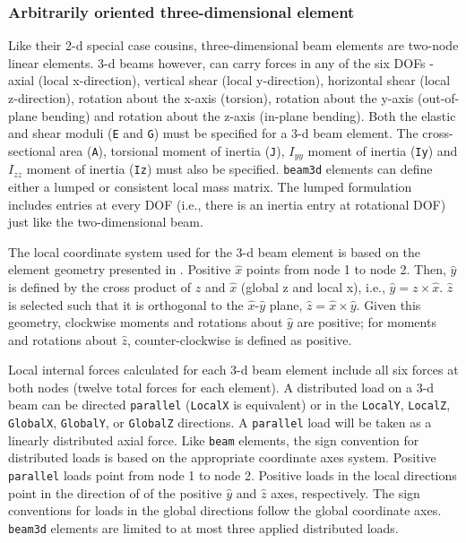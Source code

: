 \subsubsection{Arbitrarily oriented three-dimensional element}

Like their \mbox{2-d} special case cousins, three-dimensional beam elements are 
two-node linear elements.  \mbox{3-d} beams however, can carry forces in any of the 
six DOFs - axial (local x-direction), vertical shear (local y-direction), 
horizontal shear (local z-direction), rotation about the x-axis (torsion), 
rotation about the y-axis (out-of-plane bending) and rotation about the z-axis 
(in-plane bending).  Both the elastic and shear moduli ({\tt E} and {\tt G}) 
must be specified for a \mbox{3-d} beam element.  The cross-sectional area 
({\tt A}), torsional moment of inertia ({\tt J}), $I_{yy}$ moment of 
inertia ({\tt Iy}) and $I_{zz}$ moment of inertia ({\tt Iz}) must also be 
specified.  {\tt beam3d} elements can define either a lumped or consistent
local mass matrix.  The lumped formulation includes entries at every DOF
(i.e., there is an inertia entry at rotational DOF) just like the 
two-dimensional beam.

The local coordinate system used for the \felt{} \mbox{3-d} beam element is based
on the element geometry presented in \cite{logan:fem}.  Positive
$\hat x$ points from node 1 to node 2.  Then, $\hat y$ is defined by
the cross product of $z$ and $\hat x$ (global z and local x), 
i.e., $\hat y = z \times \hat x$.  $\hat z$ is selected such that it is
orthogonal to the $\hat x$-$\hat y$ plane,  
$\hat z = \hat x \times \hat y$.  Given this geometry, clockwise moments
and rotations about $\hat y$ are positive; for moments and rotations about
$\hat z$, counter-clockwise is defined as positive.

Local internal forces calculated for each \mbox{3-d} beam element include all six
forces at both nodes (twelve total forces for each element).  A distributed 
load on a \mbox{3-d} beam can be directed {\tt parallel} ({\tt LocalX} is 
equivalent) or in the {\tt LocalY},
{\tt LocalZ}, {\tt GlobalX}, {\tt GlobalY}, or {\tt GlobalZ} directions.  
A {\tt parallel} load will be taken as a linearly distributed axial force.  
Like {\tt beam} elements, the sign convention for distributed loads is
based on the appropriate coordinate axes system.
Positive {\tt parallel} loads point from node 1 to node 2.  
Positive loads in the local directions point in the direction of 
of the positive $\hat y$ and $\hat z$ axes, respectively.
The sign conventions 
for loads in the global directions follow the global coordinate axes.  
{\tt beam3d} elements are limited to at most three applied distributed loads.

